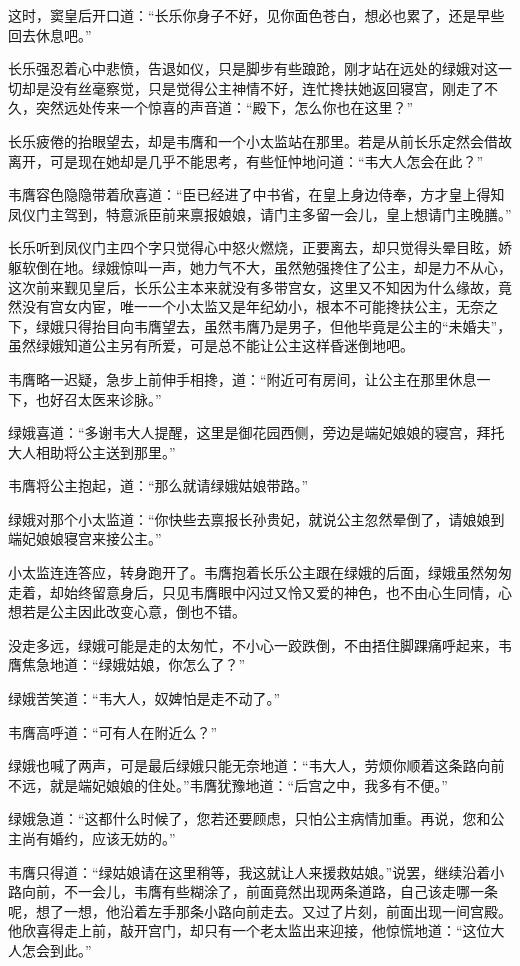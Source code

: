 这时，窦皇后开口道：“长乐你身子不好，见你面色苍白，想必也累了，还是早些回去休息吧。”

长乐强忍着心中悲愤，告退如仪，只是脚步有些踉跄，刚才站在远处的绿娥对这一切却是没有丝毫察觉，只是觉得公主神情不好，连忙搀扶她返回寝宫，刚走了不久，突然远处传来一个惊喜的声音道：“殿下，怎么你也在这里？”

长乐疲倦的抬眼望去，却是韦膺和一个小太监站在那里。若是从前长乐定然会借故离开，可是现在她却是几乎不能思考，有些怔忡地问道：“韦大人怎会在此？”

韦膺容色隐隐带着欣喜道：“臣已经进了中书省，在皇上身边侍奉，方才皇上得知凤仪门主驾到，特意派臣前来禀报娘娘，请门主多留一会儿，皇上想请门主晚膳。”

长乐听到凤仪门主四个字只觉得心中怒火燃烧，正要离去，却只觉得头晕目眩，娇躯软倒在地。绿娥惊叫一声，她力气不大，虽然勉强搀住了公主，却是力不从心，这次前来觐见皇后，长乐公主本来就没有多带宫女，这里又不知因为什么缘故，竟然没有宫女内宦，唯一一个小太监又是年纪幼小，根本不可能搀扶公主，无奈之下，绿娥只得抬目向韦膺望去，虽然韦膺乃是男子，但他毕竟是公主的“未婚夫”，虽然绿娥知道公主另有所爱，可是总不能让公主这样昏迷倒地吧。

韦膺略一迟疑，急步上前伸手相搀，道：“附近可有房间，让公主在那里休息一下，也好召太医来诊脉。”

绿娥喜道：“多谢韦大人提醒，这里是御花园西侧，旁边是端妃娘娘的寝宫，拜托大人相助将公主送到那里。”

韦膺将公主抱起，道：“那么就请绿娥姑娘带路。”

绿娥对那个小太监道：“你快些去禀报长孙贵妃，就说公主忽然晕倒了，请娘娘到端妃娘娘寝宫来接公主。”

小太监连连答应，转身跑开了。韦膺抱着长乐公主跟在绿娥的后面，绿娥虽然匆匆走着，却始终留意身后，只见韦膺眼中闪过又怜又爱的神色，也不由心生同情，心想若是公主因此改变心意，倒也不错。

没走多远，绿娥可能是走的太匆忙，不小心一跤跌倒，不由捂住脚踝痛呼起来，韦膺焦急地道：“绿娥姑娘，你怎么了？”

绿娥苦笑道：“韦大人，奴婢怕是走不动了。”

韦膺高呼道：“可有人在附近么？”

绿娥也喊了两声，可是最后绿娥只能无奈地道：“韦大人，劳烦你顺着这条路向前不远，就是端妃娘娘的住处。”韦膺犹豫地道：“后宫之中，我多有不便。”

绿娥急道：“这都什么时候了，您若还要顾虑，只怕公主病情加重。再说，您和公主尚有婚约，应该无妨的。”

韦膺只得道：“绿姑娘请在这里稍等，我这就让人来援救姑娘。”说罢，继续沿着小路向前，不一会儿，韦膺有些糊涂了，前面竟然出现两条道路，自己该走哪一条呢，想了一想，他沿着左手那条小路向前走去。又过了片刻，前面出现一间宫殿。他欣喜得走上前，敲开宫门，却只有一个老太监出来迎接，他惊慌地道：“这位大人怎会到此。”

